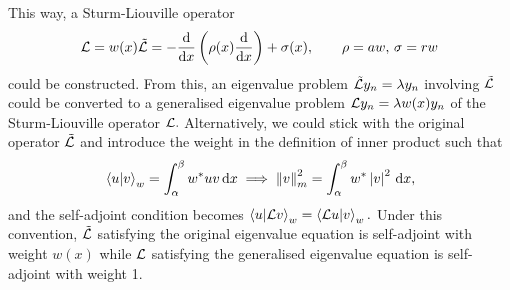 \documentclass{article}
\begin{document}
This way, a Sturm-Liouville operator
\[
    \mathcal{\MakeUppercase{L}} = w(x) \tilde{\mathcal{\MakeUppercase{L}} }
    = -\frac{\mathrm{d}}{\mathrm{d}x} \left( \rho (x) \frac{\mathrm{d}}{\mathrm{d}x} \right) + \sigma (x), \qquad 
    \rho = a w, \, \sigma  = r w 
\]
could be constructed. From this, an eigenvalue problem $\tilde{\mathcal{\MakeUppercase{L}} } y_n = \lambda y_n$ involving $\tilde{\mathcal{\MakeUppercase{L}} }$ could be converted to a generalised eigenvalue problem $\mathcal{\MakeUppercase{L}} y_n = \lambda w(x) y_n$ of the Sturm-Liouville operator $\mathcal{\MakeUppercase{L}}.$ Alternatively, we could stick with the original operator $\tilde{\mathcal{\MakeUppercase{L}}}$ and introduce the weight in the definition of inner product such that
\[
    \braket*{u}{v}_w = \int_{\alpha }^{\beta } w^* u v \,\mathrm{d}x 
    \implies \left\lVert v\right\rVert ^{2}_m = \int_{\alpha }^{\beta } w^* \left\vert v \right\vert ^{2}  \,\mathrm{d}x, 
\]
and the self-adjoint condition becomes 
\( 
    \braket{u}{\mathcal{\MakeUppercase{L}} v}_w = \braket{\mathcal{\MakeUppercase{L}} u}{v}_w.
\) 
Under this convention, $\tilde{\mathcal{\MakeUppercase{L}} }$ satisfying the original eigenvalue equation is self-adjoint with weight $w(x)$ while $\mathcal{\MakeUppercase{L}} $ satisfying the generalised eigenvalue equation is self-adjoint with weight 1. 
\end{document}
